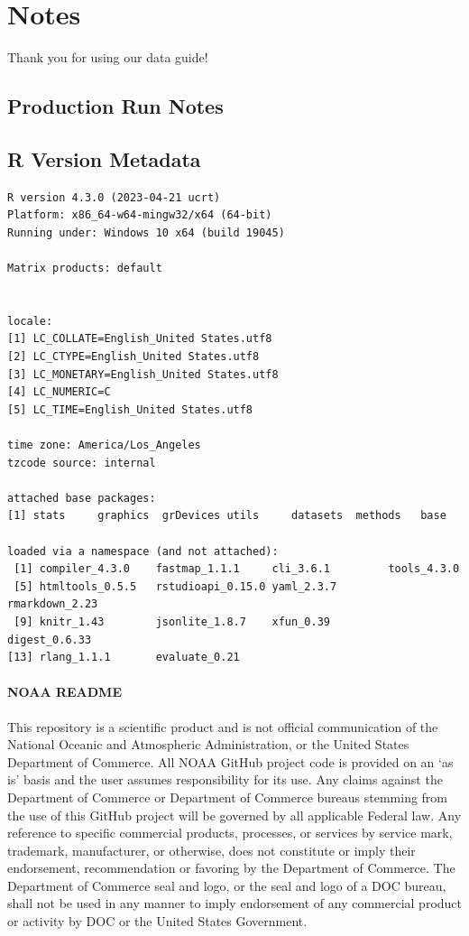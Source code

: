 \documentclass[
  letterpaper,
  oneside,
  open=any]{scrbook}
\begin{document}
\part{Notes}

Thank you for using our data guide!

\hypertarget{production-run-notes}{%
\chapter{Production Run Notes}\label{production-run-notes}}

\hypertarget{r-version-metadata}{%
\chapter{R Version Metadata}\label{r-version-metadata}}

\begin{verbatim}
R version 4.3.0 (2023-04-21 ucrt)
Platform: x86_64-w64-mingw32/x64 (64-bit)
Running under: Windows 10 x64 (build 19045)

Matrix products: default


locale:
[1] LC_COLLATE=English_United States.utf8 
[2] LC_CTYPE=English_United States.utf8   
[3] LC_MONETARY=English_United States.utf8
[4] LC_NUMERIC=C                          
[5] LC_TIME=English_United States.utf8    

time zone: America/Los_Angeles
tzcode source: internal

attached base packages:
[1] stats     graphics  grDevices utils     datasets  methods   base     

loaded via a namespace (and not attached):
 [1] compiler_4.3.0    fastmap_1.1.1     cli_3.6.1         tools_4.3.0      
 [5] htmltools_0.5.5   rstudioapi_0.15.0 yaml_2.3.7        rmarkdown_2.23   
 [9] knitr_1.43        jsonlite_1.8.7    xfun_0.39         digest_0.6.33    
[13] rlang_1.1.1       evaluate_0.21    
\end{verbatim}

\hypertarget{noaa-readme}{%
\subsection{NOAA README}\label{noaa-readme}}

This repository is a scientific product and is not official
communication of the National Oceanic and Atmospheric Administration, or
the United States Department of Commerce. All NOAA GitHub project code
is provided on an `as is' basis and the user assumes responsibility for
its use. Any claims against the Department of Commerce or Department of
Commerce bureaus stemming from the use of this GitHub project will be
governed by all applicable Federal law. Any reference to specific
commercial products, processes, or services by service mark, trademark,
manufacturer, or otherwise, does not constitute or imply their
endorsement, recommendation or favoring by the Department of Commerce.
The Department of Commerce seal and logo, or the seal and logo of a DOC
bureau, shall not be used in any manner to imply endorsement of any
commercial product or activity by DOC or the United States Government.
\end{document}
